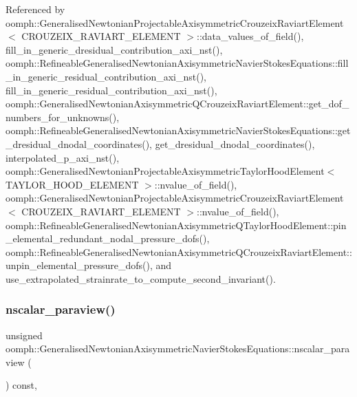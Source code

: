 Referenced by oomph\+::\+Generalised\+Newtonian\+Projectable\+Axisymmetric\+Crouzeix\+Raviart\+Element$<$ C\+R\+O\+U\+Z\+E\+I\+X\+\_\+\+R\+A\+V\+I\+A\+R\+T\+\_\+\+E\+L\+E\+M\+E\+N\+T $>$\+::data\+\_\+values\+\_\+of\+\_\+field(), fill\+\_\+in\+\_\+generic\+\_\+dresidual\+\_\+contribution\+\_\+axi\+\_\+nst(), oomph\+::\+Refineable\+Generalised\+Newtonian\+Axisymmetric\+Navier\+Stokes\+Equations\+::fill\+\_\+in\+\_\+generic\+\_\+residual\+\_\+contribution\+\_\+axi\+\_\+nst(), fill\+\_\+in\+\_\+generic\+\_\+residual\+\_\+contribution\+\_\+axi\+\_\+nst(), oomph\+::\+Generalised\+Newtonian\+Axisymmetric\+Q\+Crouzeix\+Raviart\+Element\+::get\+\_\+dof\+\_\+numbers\+\_\+for\+\_\+unknowns(), oomph\+::\+Refineable\+Generalised\+Newtonian\+Axisymmetric\+Navier\+Stokes\+Equations\+::get\+\_\+dresidual\+\_\+dnodal\+\_\+coordinates(), get\+\_\+dresidual\+\_\+dnodal\+\_\+coordinates(), interpolated\+\_\+p\+\_\+axi\+\_\+nst(), oomph\+::\+Generalised\+Newtonian\+Projectable\+Axisymmetric\+Taylor\+Hood\+Element$<$ T\+A\+Y\+L\+O\+R\+\_\+\+H\+O\+O\+D\+\_\+\+E\+L\+E\+M\+E\+N\+T $>$\+::nvalue\+\_\+of\+\_\+field(), oomph\+::\+Generalised\+Newtonian\+Projectable\+Axisymmetric\+Crouzeix\+Raviart\+Element$<$ C\+R\+O\+U\+Z\+E\+I\+X\+\_\+\+R\+A\+V\+I\+A\+R\+T\+\_\+\+E\+L\+E\+M\+E\+N\+T $>$\+::nvalue\+\_\+of\+\_\+field(), oomph\+::\+Refineable\+Generalised\+Newtonian\+Axisymmetric\+Q\+Taylor\+Hood\+Element\+::pin\+\_\+elemental\+\_\+redundant\+\_\+nodal\+\_\+pressure\+\_\+dofs(), oomph\+::\+Refineable\+Generalised\+Newtonian\+Axisymmetric\+Q\+Crouzeix\+Raviart\+Element\+::unpin\+\_\+elemental\+\_\+pressure\+\_\+dofs(), and use\+\_\+extrapolated\+\_\+strainrate\+\_\+to\+\_\+compute\+\_\+second\+\_\+invariant().

\mbox{\label{classoomph_1_1GeneralisedNewtonianAxisymmetricNavierStokesEquations_aae82381c018c86ff7abc13dddc7ff0a6}} 
\subsubsection{\texorpdfstring{nscalar\+\_\+paraview()}{nscalar\_paraview()}}
{\footnotesize\ttfamily unsigned oomph\+::\+Generalised\+Newtonian\+Axisymmetric\+Navier\+Stokes\+Equations\+::nscalar\+\_\+paraview (\begin{DoxyParamCaption}{ }\end{DoxyParamCaption}) const\hspace{0.3cm}{\ttfamily [inline]}, {\ttfamily [virtual]}}



